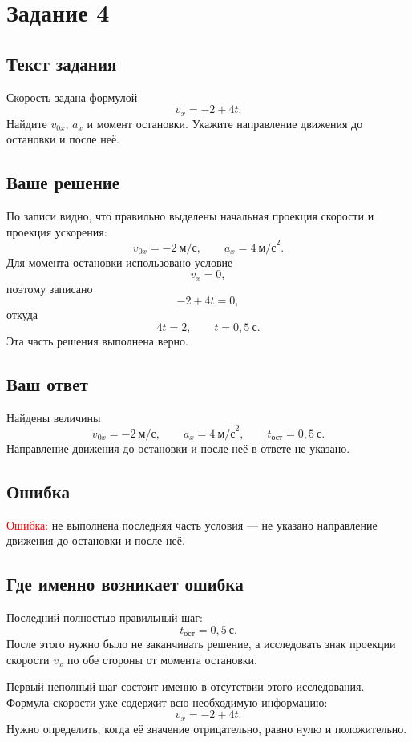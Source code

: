 \documentclass[12pt,a4paper]{article}
\begin{document}
\label{task:4}
\section*{Задание 4}

\subsection*{Текст задания}
Скорость задана формулой
\[
v_x=-2+4t.
\]
Найдите $v_{0x}$, $a_x$ и момент остановки. Укажите направление движения до остановки и после неё.

\subsection*{Ваше решение}
По записи видно, что правильно выделены начальная проекция скорости и проекция ускорения:
\[
v_{0x}=-2\ \text{м/с},
\qquad
 a_x=4\ \text{м/с}^2.
\]
Для момента остановки использовано условие
\[
v_x=0,
\]
поэтому записано
\[
-2+4t=0,
\]
откуда
\[
4t=2,
\qquad
 t=0{,}5\ \text{с}.
\]
Эта часть решения выполнена верно.

\subsection*{Ваш ответ}
Найдены величины
\[
v_{0x}=-2\ \text{м/с},
\qquad
 a_x=4\ \text{м/с}^2,
\qquad
 t_{\text{ост}}=0{,}5\ \text{с}.
\]
Направление движения до остановки и после неё в ответе не указано.

\subsection*{Ошибка}
\textcolor{red}{Ошибка:} не выполнена последняя часть условия --- не указано направление движения до остановки и после неё.

\subsection*{Где именно возникает ошибка}
Последний полностью правильный шаг:
\[
\boxed{t_{\text{ост}}=0{,}5\ \text{с}}.
\]
После этого нужно было не заканчивать решение, а исследовать знак проекции скорости $v_x$ по обе стороны от момента остановки.

Первый неполный шаг состоит именно в отсутствии этого исследования. Формула скорости уже содержит всю необходимую информацию:
\[
v_x=-2+4t.
\]
Нужно определить, когда её значение отрицательно, равно нулю и положительно.
\end{document}
